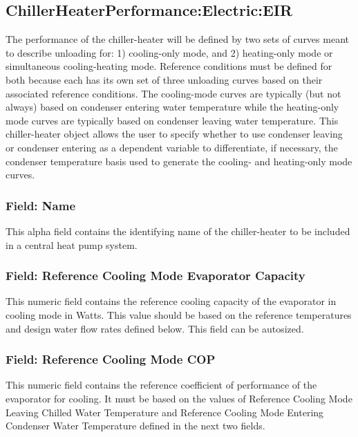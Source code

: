 \subsection{ChillerHeaterPerformance:Electric:EIR}\label{chillerheaterperformancelectriceir}

The performance of the chiller-heater will be defined by two sets of curves meant to describe unloading for: 1) cooling-only mode, and 2) heating-only mode or simultaneous cooling-heating mode. Reference conditions must be defined for both because each has its own set of three unloading curves based on their associated reference conditions. The cooling-mode curves are typically (but not always) based on condenser entering water temperature while the heating-only mode curves are typically based on condenser leaving water temperature. This chiller-heater object allows the user to specify whether to use condenser leaving or condenser entering as a dependent variable to differentiate, if necessary, the condenser temperature basis used to generate the cooling- and heating-only mode curves.

\subsubsection{Field: Name}\label{field-name-19-002}

This alpha field contains the identifying name of the chiller-heater to be included in a central heat pump system.

\subsubsection{Field: Reference Cooling Mode Evaporator Capacity}\label{field-reference-cooling-mode-evaporator-capacity}

This numeric field contains the reference cooling capacity of the evaporator in cooling mode in Watts. This value should be based on the reference temperatures and design water flow rates defined below. This field can be autosized.

\subsubsection{Field: Reference Cooling Mode COP}\label{field-reference-cooling-mode-cop}

This numeric field contains the reference coefficient of performance of the evaporator for cooling. It must be based on the values of Reference Cooling Mode Leaving Chilled Water Temperature and Reference Cooling Mode Entering Condenser Water Temperature defined in the next two fields.

